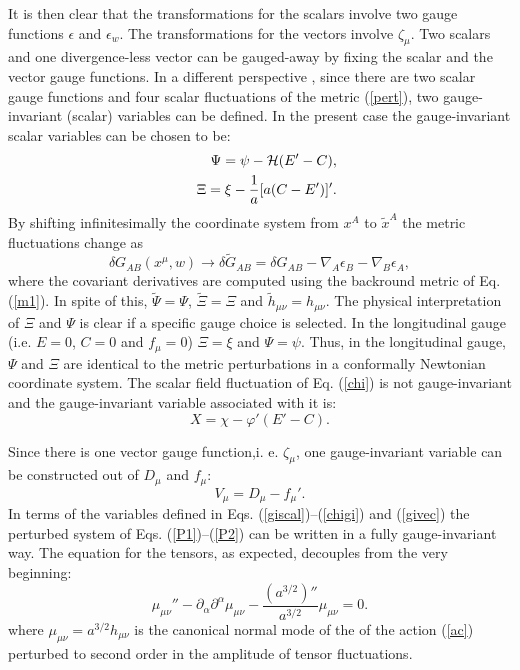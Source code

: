 \documentclass[a4paper,12pt]{article}
\begin{document}
It is then clear that the 
 transformations for the scalars involve two gauge functions $\epsilon$ 
and $\epsilon_{w}$. The transformations for the vectors involve $\zeta_{\mu}$.
Two scalars and one divergence-less vector can be gauged-away 
by fixing the scalar and the vector gauge functions. In a different 
perspective \cite{bardeen}, since there are two scalar gauge functions and 
four scalar fluctuations of the metric (\ref{pert}), two gauge-invariant
(scalar) variables can be defined. In the present case the gauge-invariant 
scalar variables can be chosen to be:
\begin{eqnarray}
&&\Psi = \psi - {\cal H}  ( E' - C), 
\nonumber\\
&& \Xi =\xi - \frac{1}{a} [ a( C - E')]'.
\label{giscal}
\end{eqnarray}
By shifting infinitesimally the coordinate system from $x^{A}$ to 
$\tilde{x}^{A}$ the metric fluctuations change as 
\begin{equation}
\delta {G}_{AB}(x^{\mu},w) \rightarrow  \delta \tilde{G}_{A B} = 
\delta G_{AB} - \nabla_{A} \epsilon_{B} - \nabla_{B}
\epsilon_{A}, 
\label{liederiv}
\end{equation}
where the covariant derivatives are computed using the backround metric 
of Eq. (\ref{m1}). In spite of this,   
$\tilde{\Psi}= \Psi$, $\tilde{\Xi} = \Xi$ and $\tilde{h}_{\mu\nu} 
= h_{\mu\nu}$. The 
physical interpretation of $\Xi$ and $\Psi$ is clear if a specific gauge 
choice is selected. In the longitudinal gauge (i.e. $E=0$, $C=0$ and 
$f_{\mu}=0$) $\Xi= \xi$ and $\Psi =\psi$. Thus, in the longitudinal 
gauge, $\Psi$ and $\Xi$ are identical to the metric perturbations 
in a conformally Newtonian coordinate system. The 
scalar field fluctuation of Eq. (\ref{chi}) is not gauge-invariant and 
the gauge-invariant variable associated with it is:
\begin{equation}
X = \chi - \varphi' (E' -C).
\label{chigi}
\end{equation}

Since there is one vector gauge function,i. e. $\zeta_{\mu}$, 
one gauge-invariant variable 
can be constructed out of $D_{\mu}$ and $f_{\mu}$:
\begin{equation}
V_{\mu} = D_{\mu} - f_{\mu}'.
\label{givec}
\end{equation}
In terms of the variables defined in Eqs. (\ref{giscal})--(\ref{chigi}) 
and (\ref{givec}) the perturbed system of Eqs. (\ref{P1})--(\ref{P2}) 
can be written in a fully gauge-invariant way. The equation for the 
tensors, as expected, decouples from the very beginning:
\begin{equation}
\mu_{\mu\nu}'' - \partial_{\alpha}\partial^{\alpha} \mu_{\mu\nu} 
- \frac{(a^{3/2})''}{a^{3/2}} \mu_{\mu\nu} =0.
\label{mu}
\end{equation}
where $\mu_{\mu\nu} =a^{3/2} h_{\mu\nu}$ is the canonical 
normal mode of the of the action (\ref{ac}) perturbed to second order 
in the amplitude of tensor fluctuations.
\end{document}
